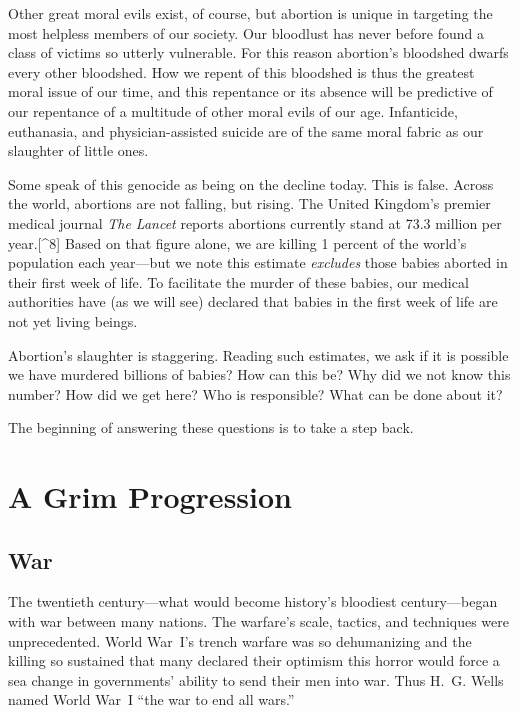 \documentclass[
]{book}
\begin{document}
Other great moral evils exist, of course, but abortion is unique in targeting the most helpless members of our society. Our bloodlust has never before found a class of victims so utterly vulnerable. For this reason abortion's bloodshed dwarfs every other bloodshed. How we repent of this bloodshed is thus the greatest moral issue of our time, and this repentance or its absence will be predictive of our repentance of a multitude of other moral evils of our age. Infanticide, euthanasia, and physician-assisted suicide are of the same moral fabric as our slaughter of little ones.

Some speak of this genocide as being on the decline today. This is false. Across the world, abortions are not falling, but rising. The United Kingdom's premier medical journal \emph{The Lancet} reports abortions currently stand at 73.3 million per year.{[}\^{}8{]} Based on that figure alone, we are killing 1 percent of the world's population each year---but we note this estimate \emph{excludes} those babies aborted in their first week of life. To facilitate the murder of these babies, our medical authorities have (as we will see) declared that babies in the first week of life are not yet living beings.

Abortion's slaughter is staggering. Reading such estimates, we ask if it is possible we have murdered billions of babies? How can this be? Why did we not know this number? How did we get here? Who is responsible? What can be done about it?

The beginning of answering these questions is to take a step back.

\hypertarget{a-grim-progression}{%
\section{A Grim Progression}\label{a-grim-progression}}

\hypertarget{war}{%
\subsection{War}\label{war}}

The twentieth century---what would become history's bloodiest century---began with war between many nations. The warfare's scale, tactics, and techniques were unprecedented. World War~I's trench warfare was so dehumanizing and the killing so sustained that many declared their optimism this horror would force a sea change in governments' ability to send their men into war. Thus H.~G. Wells named World War~I ``the war to end all wars.''
\end{document}

